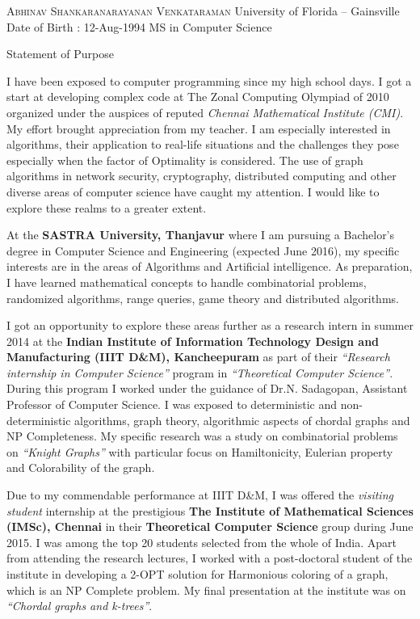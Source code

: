 \documentclass[11pt]{article}
\begin{document}
\begin{flushleft}{\textsc{Abhinav Shankaranarayanan Venkataraman} \hfill University of Florida -- Gainsville \newline Date of Birth : 12-Aug-1994  \hfill MS in Computer Science}\end{flushleft}
\begin{center}
{\LARGE Statement of Purpose}
\end{center}

I have been exposed to computer programming since my high school days.  I got a start at developing complex code at The Zonal Computing Olympiad of 2010 organized under the auspices of reputed \emph{Chennai Mathematical Institute (CMI)}. My effort brought appreciation from my teacher.   I am especially interested in algorithms, their application to real-life situations and the challenges they pose especially when the factor of Optimality is considered. The use of graph algorithms in network security, cryptography, distributed computing and other diverse areas of computer science have caught my attention.  I would like to explore these realms to a greater extent.
\\\par
At the \textbf{SASTRA University, Thanjavur} where I am pursuing a Bachelor's degree in Computer Science and Engineering (expected June 2016), my specific interests are in the areas of Algorithms and Artificial intelligence.  As preparation, I have learned mathematical concepts to handle combinatorial problems, randomized algorithms, range queries, game theory and distributed algorithms.
\\\par
I got an opportunity to explore these areas further as a research intern in summer 2014 at the \textbf{Indian Institute of Information Technology Design and Manufacturing (IIIT D\&M), Kancheepuram} as part of their \emph{``Research internship in Computer Science''} program in \emph{``Theoretical Computer Science''}.  During this program I worked under the guidance of Dr.N. Sadagopan, Assistant Professor of Computer Science. I was exposed to deterministic and non-deterministic algorithms, graph theory, algorithmic aspects of chordal graphs and NP Completeness. My specific research was a study on combinatorial problems on \emph{``Knight Graphs''} with particular focus on Hamiltonicity, Eulerian property and Colorability of the graph.
\\\par
Due to my commendable performance at IIIT D\&M, I was offered the \emph{visiting student} internship at the prestigious \textbf{The Institute of Mathematical Sciences (IMSc), Chennai} in their \textbf{Theoretical Computer Science} group during June 2015. I was among the top 20 students selected from the whole of India. Apart from attending the research lectures, I worked with a post-doctoral student of the institute in developing a 2-OPT solution for Harmonious coloring of a graph, which is an NP Complete problem. My final presentation at the institute was on \emph{``Chordal graphs and k-trees''}.
\end{document}
